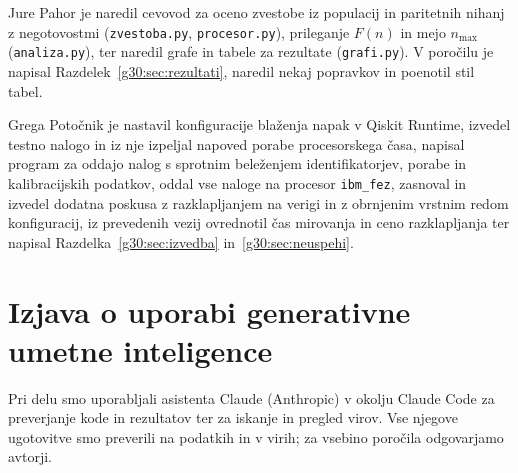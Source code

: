 Jure Pahor je naredil cevovod za oceno zvestobe iz populacij in paritetnih nihanj z negotovostmi (\texttt{zvestoba.py}, \texttt{procesor.py}), prileganje $F(n)$ in mejo $n_{\mathrm{max}}$ (\texttt{analiza.py}), ter naredil grafe in tabele za rezultate (\texttt{grafi.py}). 
V poročilu je napisal Razdelek~\ref{g30:sec:rezultati}, naredil nekaj popravkov in poenotil stil tabel.

Grega Potočnik je nastavil konfiguracije blaženja napak v Qiskit Runtime, izvedel testno nalogo in iz nje izpeljal napoved porabe procesorskega časa, napisal program za oddajo nalog s sprotnim beleženjem identifikatorjev, porabe in kalibracijskih podatkov, oddal vse naloge na procesor \texttt{ibm\_fez}, zasnoval in izvedel dodatna poskusa z razklapljanjem na verigi in z obrnjenim vrstnim redom konfiguracij, iz prevedenih vezij ovrednotil čas mirovanja in ceno razklapljanja ter napisal Razdelka~\ref{g30:sec:izvedba} in~\ref{g30:sec:neuspehi}.

\section*{Izjava o uporabi generativne umetne inteligence}

Pri delu smo uporabljali asistenta Claude (Anthropic) v okolju Claude Code za preverjanje kode in rezultatov ter za iskanje in pregled virov. Vse njegove ugotovitve smo preverili na podatkih in v virih; za vsebino poročila odgovarjamo avtorji.
